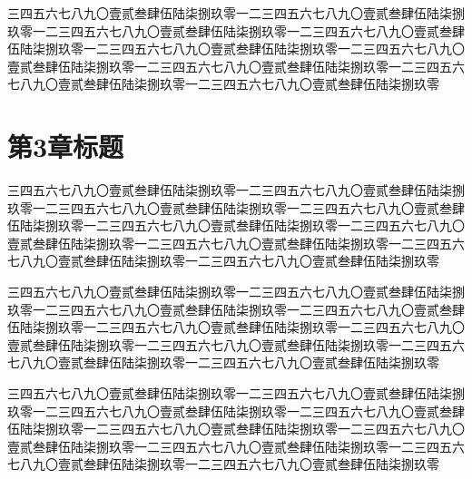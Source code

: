 \documentclass[master,academic]{ysuthesis} %
\begin{document}
		三四五六七八九〇壹贰叁肆伍陆柒捌玖零一二三四五六七八九〇壹贰叁肆伍陆柒捌玖零一二三四五六七八九〇壹贰叁肆伍陆柒捌玖零一二三四五六七八九〇壹贰叁肆伍陆柒捌玖零一二三四五六七八九〇壹贰叁肆伍陆柒捌玖零一二三四五六七八九〇壹贰叁肆伍陆柒捌玖零一二三四五六七八九〇壹贰叁肆伍陆柒捌玖零一二三四五六七八九〇壹贰叁肆伍陆柒捌玖零一二三四五六七八九〇壹贰叁肆伍陆柒捌玖零

	\chapter{第3章标题}

		三四五六七八九〇壹贰叁肆伍陆柒捌玖零一二三四五六七八九〇壹贰叁肆伍陆柒捌玖零一二三四五六七八九〇壹贰叁肆伍陆柒捌玖零一二三四五六七八九〇壹贰叁肆伍陆柒捌玖零一二三四五六七八九〇壹贰叁肆伍陆柒捌玖零一二三四五六七八九〇壹贰叁肆伍陆柒捌玖零一二三四五六七八九〇壹贰叁肆伍陆柒捌玖零一二三四五六七八九〇壹贰叁肆伍陆柒捌玖零一二三四五六七八九〇壹贰叁肆伍陆柒捌玖零

		三四五六七八九〇壹贰叁肆伍陆柒捌玖零一二三四五六七八九〇壹贰叁肆伍陆柒捌玖零一二三四五六七八九〇壹贰叁肆伍陆柒捌玖零一二三四五六七八九〇壹贰叁肆伍陆柒捌玖零一二三四五六七八九〇壹贰叁肆伍陆柒捌玖零一二三四五六七八九〇壹贰叁肆伍陆柒捌玖零一二三四五六七八九〇壹贰叁肆伍陆柒捌玖零一二三四五六七八九〇壹贰叁肆伍陆柒捌玖零一二三四五六七八九〇壹贰叁肆伍陆柒捌玖零

		三四五六七八九〇壹贰叁肆伍陆柒捌玖零一二三四五六七八九〇壹贰叁肆伍陆柒捌玖零一二三四五六七八九〇壹贰叁肆伍陆柒捌玖零一二三四五六七八九〇壹贰叁肆伍陆柒捌玖零一二三四五六七八九〇壹贰叁肆伍陆柒捌玖零一二三四五六七八九〇壹贰叁肆伍陆柒捌玖零一二三四五六七八九〇壹贰叁肆伍陆柒捌玖零一二三四五六七八九〇壹贰叁肆伍陆柒捌玖零一二三四五六七八九〇壹贰叁肆伍陆柒捌玖零
\end{document}
